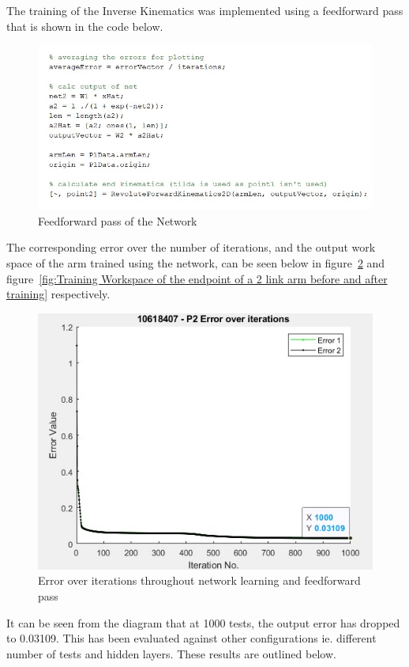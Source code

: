 \documentclass [11pt]{article}
\begin{document}
The training of the Inverse Kinematics was implemented using a feedforward pass that is shown in the code below. 

\begin{figure}[H]
\centerline{\includegraphics[width=12cm]{Neural_network_feed_forward}}
\caption{Feedforward pass of the Network}
\label{fig:feed_forward_pass}
\end{figure}

The corresponding error over the number of iterations, and the output work space of the arm trained using the network, can be seen below in figure~\ref{fig:errorOverIterations} and figure~\ref{fig:Training Workspace of the endpoint of a 2 link arm before and after training} respectively.

\begin{figure}[H]
\centerline{\includegraphics[width=12cm]{error_over_itterations}}
\caption{Error over iterations throughout network learning and feedforward pass}
\label{fig:errorOverIterations}
\end{figure}

It can be seen from the diagram that at 1000 tests, the output error has dropped to 0.03109. This has been evaluated against other configurations ie. different number of tests and hidden layers. These results are outlined below. 
\end{document}
